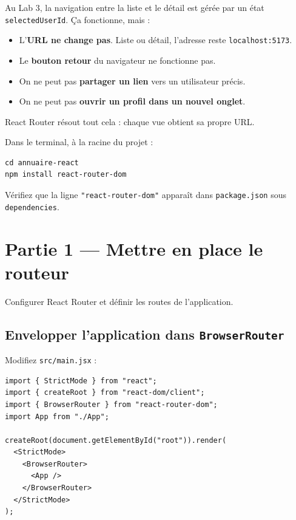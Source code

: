 \documentclass[11pt,a4paper]{article}
\begin{document}
Au Lab 3, la navigation entre la liste et le détail est gérée par un état \texttt{selectedUserId}. Ça fonctionne, mais :

\begin{itemize}[nosep]
\item L'\textbf{URL ne change pas}. Liste ou détail, l'adresse reste \texttt{localhost:5173}.
\item Le \textbf{bouton retour} du navigateur ne fonctionne pas.
\item On ne peut pas \textbf{partager un lien} vers un utilisateur précis.
\item On ne peut pas \textbf{ouvrir un profil dans un nouvel onglet}.
\end{itemize}

React Router résout tout cela : chaque vue obtient sa propre URL.

\begin{objectifbox}
Dans le terminal, à la racine du projet :

\begin{lstlisting}[style=terminal]
cd annuaire-react
npm install react-router-dom
\end{lstlisting}

Vérifiez que la ligne \texttt{"react-router-dom"} apparaît dans \texttt{package.json} sous \texttt{dependencies}.
\end{objectifbox}

\section{Partie 1 --- Mettre en place le routeur}
\label{sec:routeur}

\begin{objectifbox}
Configurer React Router et définir les routes de l'application.
\end{objectifbox}

\subsection{Envelopper l'application dans \texttt{BrowserRouter}}

Modifiez \texttt{src/main.jsx} :

\begin{lstlisting}
import { StrictMode } from "react";
import { createRoot } from "react-dom/client";
import { BrowserRouter } from "react-router-dom";
import App from "./App";

createRoot(document.getElementById("root")).render(
  <StrictMode>
    <BrowserRouter>
      <App />
    </BrowserRouter>
  </StrictMode>
);
\end{lstlisting}
\end{document}
